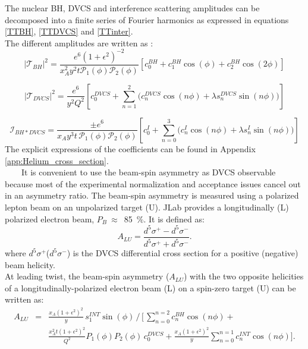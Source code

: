 The nuclear BH, DVCS and interference scattering amplitudes can be decomposed 
into a finite series of Fourier harmonics as expressed in  equations 
\ref{TTBH}, \ref{TTDVCS} and \ref{TTinter}.\\
The different amplitudes are written as \cite{Belitsky:2008bz}:
\small
\begin{equation}
 |\mathcal{T}_{BH}|^{2} =  \frac{e^{6} (1 + \epsilon^{2})^{-2}}{x^{2}_{A} y^{2} 
 t \mathcal{P}_{1}(\phi) \mathcal{P}_{2}(\phi)} \left[ c_{0}^{BH} + c_{1}^{BH} 
 \cos(\phi) + c_{2}^{BH} \cos(2\phi)\right] \label{TTBH}
\end{equation}

\begin{equation}
 |\mathcal{T}_{DVCS}|^{2} =  \frac{e^{6}}{y^{2} Q^{2}} \left[ c_{0}^{DVCS} + 
 \sum_{n=1}^{2} \Bigg( c_{n}^{DVCS} \cos(n \phi) + \lambda s_{n}^{DVCS} \sin(n 
 \phi)\Bigg) \right] \label{TTDVCS}
\end{equation}

\begin{equation}
 \mathcal{I}_{BH*DVCS} =  \frac{\pm e^{6}}{x_A y^{3} t \, \mathcal{P}_{1}(\phi) 
 \mathcal{P}_{2}(\phi)} \left[ c_{0}^{I} + \sum_{n=0}^{3} \Bigg( c_{n}^{I} 
 \cos(n \phi) + \lambda s_{n}^{I} \sin(n \phi) \Bigg) \right] \label{TTinter} 
 \end{equation}
The explicit expressions of the coefficients can be found in Appendix 
\ref{app:Helium_cross_section}.\\


~~~~It is convenient to use the beam-spin asymmetry as DVCS observable because 
most of the experimental normalization and acceptance issues cancel out in an 
asymmetry ratio. The beam-spin asymmetry is measured using a polarized lepton 
beam on an unpolarized target (U). JLab provides a longitudinally (L) polarized 
electron beam, $P_{B}~\approx$~85~$\%$. It is defined as:
  \begin{equation}
  A_{LU} = \frac{d^{5}\sigma^{+} - d^{5}\sigma^{-} }
                {d^{5}\sigma^{+} + d^{5}\sigma^{-}}.
    \label{BSA_equation}
  \end{equation}
 where $d^{5}\sigma^{+}$($d^{5}\sigma^{-}$) is the DVCS differential cross 
 section for a positive (negative) beam helicity.\\

 At leading twist, the beam-spin asymmetry ($A_{LU}$) with the  two opposite 
 helicities of a  longitudinally-polarized electron beam (L) on a spin-zero 
 target (U) can be written as:        \begin{eqnarray}
A_{LU}& =& \frac{x_A(1+\epsilon^2)^2}{y} \, s_1^{INT} \sin(\phi) \, 
\bigg/ \, \bigg[ \, \sum_{n=0}^{n=2}c_n^{BH}\cos{(n\phi)} +  \\
& & \frac{x_A^2 t {(1+\epsilon^2)}^2}{Q^2} P_1(\phi) P_2(\phi) \, c_0^{DVCS} + 
\frac{x_A (1+\epsilon^2)^2}{y} \sum_{n=0}^{n=1} c_n^{INT} \cos{(n\phi)} \bigg].  \nonumber 
\label{eq:coh_BSA}
\end{eqnarray}

